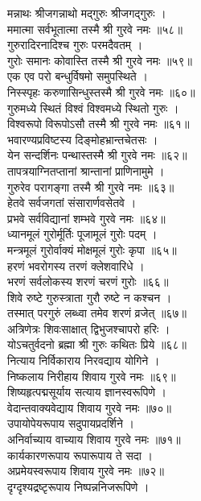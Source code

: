 मन्नाथः श्रीजगन्नाथो मद्गुरुः श्रीजगद्गुरुः ।\\
ममात्मा सर्वभूतात्मा तस्मै श्री गुरवे नमः ॥५८॥\\
गुरुरादिरनादिश्च गुरुः परमदैवतम् ।\\
गुरोः समानः कोवास्ति तस्मै श्री गुरवे नमः ॥५९॥\\
एक एव परो बन्धुर्विषमो समुपस्थिते ।\\
निस्स्पृहः करुणासिन्धुस्तस्मै श्री गुरवे नमः ॥६०॥\\
गुरुमध्ये स्थितं विश्वं विश्वमध्ये स्थितो गुरुः ।\\
विश्वरूपो विरूपोऽसौ तस्मै श्री गुरवे नमः ॥६१॥\\
भवारण्यप्रविष्टस्य दिङ्‍मोहभ्रान्तचेतसः ।\\
येन सन्दर्शिनः पन्थास्तस्मै श्री गुरवे नमः ॥६२॥\\
तापत्रयाग्नितप्तानां श्रान्तानां प्राणिनामुमे ।\\
गुरुरेव परागङ्गा तस्मै श्री गुरवे नमः ॥६३॥\\
हेतवे सर्वजगतां संसारार्णवसेतवे ।\\
प्रभवे सर्वविद्यानां शम्भवे गुरवे नमः ॥६४॥\\
ध्यानमूलं गुरोर्मूर्तिः पूजामूलं गुरोः पदम् ।\\
मन्त्रमूलं गुरोर्वाक्यं मोक्षमूलं गुरोः कृपा ॥६५॥\\
हरणं भवरोगस्य तरणं क्लेशवारिधे  ।\\
भरणं सर्वलोकस्य शरणं चरणं गुरोः ॥६६॥\\
शिवे रुष्टे गुरुस्त्राता गुरौ रुष्टे न कश्चन ।\\
तस्मात् परगुरुं लब्ध्वा तमेव शरणं व्रजेत् ॥६७॥\\
अत्रिणेत्रः शिवःसाक्षात् द्विभुजश्चापरो हरिः ।\\
योऽचतुर्वदनो ब्रह्मा श्री गुरुः कथितः प्रिये ॥६८॥\\
नित्याय निर्विकाराय निरवद्याय योगिने ।\\
निष्कलाय निरीहाय शिवाय गुरवे नमः ॥६९॥\\
शिष्यहृत्पद्मसूर्याय सत्याय ज्ञानस्वरूपिणे ।\\
वेदान्तवाक्यवेद्याय शिवाय गुरवे नमः ॥७०॥\\
उपायोपेयरूपाय सदुपायप्रदर्शिने ।\\
अनिर्वाच्याय वाच्याय शिवाय गुरवे नमः ॥७१॥\\
कार्यकारणरूपाय रूपारूपाय ते सदा ।\\
अप्रमेयस्वरूपाय शिवाय गुरवे नमः ॥७२॥\\
दृग्दृश्यद्रष्टृरूपाय निष्पन्ननिजरूपिणे ।\\
